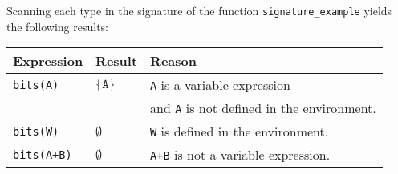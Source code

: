 \documentclass{book}
\begin{document}
Scanning each type in the signature
of the function \texttt{signature\_example} yields the following results:
\begin{center}
\begin{tabular}{lll}
\textbf{Expression} & \textbf{Result} & \textbf{Reason}\\
\hline
\texttt{bits(A)} & $\{\texttt{A}\}$ & \texttt{A} is a variable expression \\
& & and \texttt{A} is not defined in the environment.\\
\texttt{bits(W)} & $\emptyset$ & \texttt{W} is defined in the environment.\\
\texttt{bits(A+B)} & $\emptyset$ & \texttt{A+B} is not a variable expression.\\
\end{tabular}
\end{center}
\end{document}
